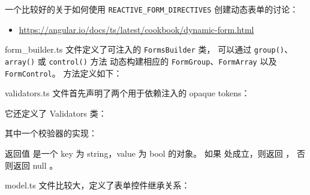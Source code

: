一个比较好的关于如何使用 \texttt{REACTIVE\_FORM\_DIRECTIVES} 创建动态表单的讨论：

\begin{itemize}
  \item \url{https://angular.io/docs/ts/latest/cookbook/dynamic-form.html}
\end{itemize}


form\_builder.ts 文件定义了可注入的 \texttt{FormsBuilder} 类，
可以通过 \texttt{group()}、\texttt{array()} 或 \texttt{control()} 方法
动态构建相应的 \texttt{FormGroup}、\texttt{FormArray} 以及 \texttt{FormControl}。
方法定义如下：




validators.ts 文件首先声明了两个用于依赖注入的 opaque tokens：




它还定义了 Validators 类：




其中一个校验器的实现：




返回值  是一个 key 为 string，value 为 bool 的对象。
如果  处成立，则返回  ，
否则返回 null 。


model.ts 文件比较大，定义了表单控件继承关系：


